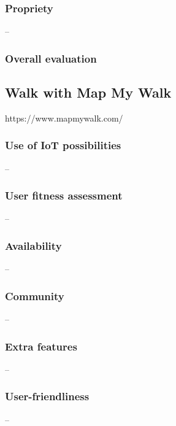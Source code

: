 \subsubsection*{Propriety} -- 
\subsubsection*{Overall evaluation}
\subsection{Walk with Map My Walk}
https://www.mapmywalk.com/
\subsubsection*{Use of IoT possibilities} --
\subsubsection*{User fitness assessment} --
\subsubsection*{Availability} --
\subsubsection*{Community} -- 
\subsubsection*{Extra features} -- 
\subsubsection*{User-friendliness} -- 

